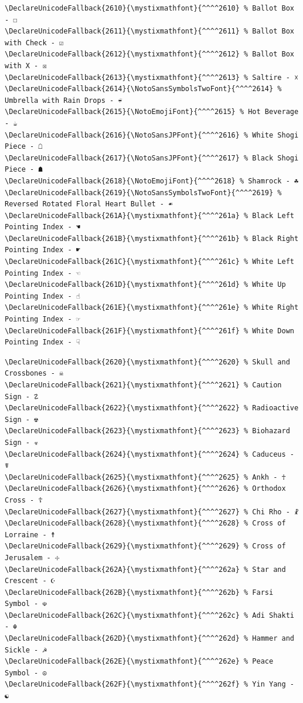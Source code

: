 \documentclass[12pt, twoside]{article}
\begin{document}
\begin{verbatim}
\DeclareUnicodeFallback{2610}{\mystixmathfont}{^^^^2610} % Ballot Box - ☐
\DeclareUnicodeFallback{2611}{\mystixmathfont}{^^^^2611} % Ballot Box with Check - ☑
\DeclareUnicodeFallback{2612}{\mystixmathfont}{^^^^2612} % Ballot Box with X - ☒
\DeclareUnicodeFallback{2613}{\mystixmathfont}{^^^^2613} % Saltire - ☓
\DeclareUnicodeFallback{2614}{\NotoSansSymbolsTwoFont}{^^^^2614} % Umbrella with Rain Drops - ☔
\DeclareUnicodeFallback{2615}{\NotoEmojiFont}{^^^^2615} % Hot Beverage - ☕
\DeclareUnicodeFallback{2616}{\NotoSansJPFont}{^^^^2616} % White Shogi Piece - ☖
\DeclareUnicodeFallback{2617}{\NotoSansJPFont}{^^^^2617} % Black Shogi Piece - ☗
\DeclareUnicodeFallback{2618}{\NotoEmojiFont}{^^^^2618} % Shamrock - ☘
\DeclareUnicodeFallback{2619}{\NotoSansSymbolsTwoFont}{^^^^2619} % Reversed Rotated Floral Heart Bullet - ☙
\DeclareUnicodeFallback{261A}{\mystixmathfont}{^^^^261a} % Black Left Pointing Index - ☚
\DeclareUnicodeFallback{261B}{\mystixmathfont}{^^^^261b} % Black Right Pointing Index - ☛
\DeclareUnicodeFallback{261C}{\mystixmathfont}{^^^^261c} % White Left Pointing Index - ☜
\DeclareUnicodeFallback{261D}{\mystixmathfont}{^^^^261d} % White Up Pointing Index - ☝
\DeclareUnicodeFallback{261E}{\mystixmathfont}{^^^^261e} % White Right Pointing Index - ☞
\DeclareUnicodeFallback{261F}{\mystixmathfont}{^^^^261f} % White Down Pointing Index - ☟

\end{verbatim}
\newpage
\begin{verbatim}
\DeclareUnicodeFallback{2620}{\mystixmathfont}{^^^^2620} % Skull and Crossbones - ☠
\DeclareUnicodeFallback{2621}{\mystixmathfont}{^^^^2621} % Caution Sign - ☡
\DeclareUnicodeFallback{2622}{\mystixmathfont}{^^^^2622} % Radioactive Sign - ☢
\DeclareUnicodeFallback{2623}{\mystixmathfont}{^^^^2623} % Biohazard Sign - ☣
\DeclareUnicodeFallback{2624}{\mystixmathfont}{^^^^2624} % Caduceus - ☤
\DeclareUnicodeFallback{2625}{\mystixmathfont}{^^^^2625} % Ankh - ☥
\DeclareUnicodeFallback{2626}{\mystixmathfont}{^^^^2626} % Orthodox Cross - ☦
\DeclareUnicodeFallback{2627}{\mystixmathfont}{^^^^2627} % Chi Rho - ☧
\DeclareUnicodeFallback{2628}{\mystixmathfont}{^^^^2628} % Cross of Lorraine - ☨
\DeclareUnicodeFallback{2629}{\mystixmathfont}{^^^^2629} % Cross of Jerusalem - ☩
\DeclareUnicodeFallback{262A}{\mystixmathfont}{^^^^262a} % Star and Crescent - ☪
\DeclareUnicodeFallback{262B}{\mystixmathfont}{^^^^262b} % Farsi Symbol - ☫
\DeclareUnicodeFallback{262C}{\mystixmathfont}{^^^^262c} % Adi Shakti - ☬
\DeclareUnicodeFallback{262D}{\mystixmathfont}{^^^^262d} % Hammer and Sickle - ☭
\DeclareUnicodeFallback{262E}{\mystixmathfont}{^^^^262e} % Peace Symbol - ☮
\DeclareUnicodeFallback{262F}{\mystixmathfont}{^^^^262f} % Yin Yang - ☯

\end{verbatim}
\end{document}

